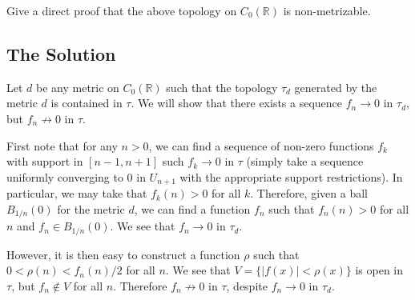 Give a direct proof that the above topology on \(C_0(\mathbb R)\) is non-metrizable. 

\subsection*{The Solution}

Let \(d\) be any metric on \(C_0(\mathbb R)\) such that the topology \(\tau_d\) generated by the metric \(d\) is
contained in \(\tau\). We will show that there exists a sequence \(f_n \to 0\) in \(\tau_d\), but
\(f_n \not \to 0\) in \(\tau\).

First note that for any \(n > 0\), we can find a sequence of non-zero functions \(f_k\) with support
in \([n-1, n+1]\) such \(f_k \to 0\) in \(\tau\) (simply take a sequence uniformly converging 
to \(0\) in \(U_{n + 1}\) with the appropriate support restrictions). In particular, we may take that
\(f_k(n) > 0\) for all \(k\). Therefore, given a ball \(B_{1/n}(0)\)
for the metric \(d\), we can find a function \(f_n\) such that \(f_n(n) > 0\) for all \(n\)
and \(f_n \in B_{1/n}(0)\). We see that \(f_n \to 0\) in \(\tau_d\).

However, it is then easy to construct a function \(\rho\) such that \(0 < \rho(n) < f_n(n)/2\) for all \(n\).
We see that \(V = \{|f(x)| < \rho(x)\}\) is open in \(\tau\), but \(f_n \not \in V\) for all \(n\). Therefore
\(f_n \not \to 0\) in \(\tau\), despite \(f_n \to 0\) in \(\tau_d\). 

